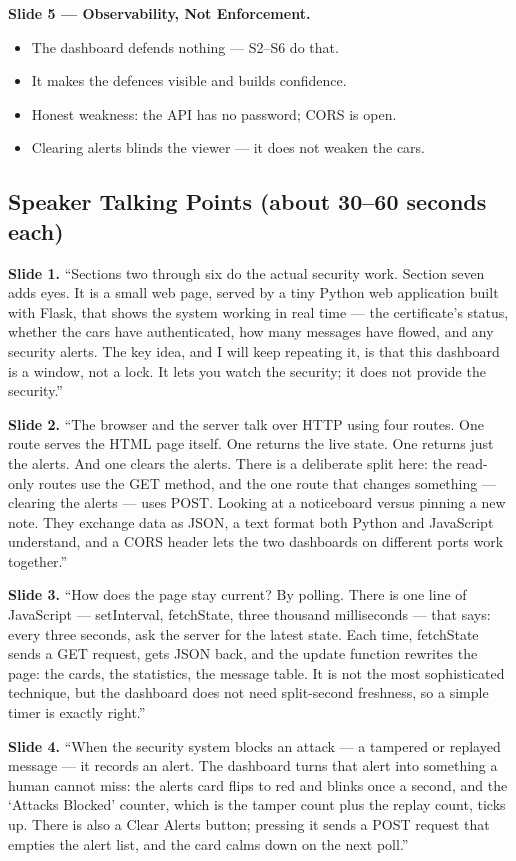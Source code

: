 \documentclass[11pt,a4paper]{report}
\begin{document}
\textbf{Slide 5 --- Observability, Not Enforcement.}
\begin{itemize}
  \item The dashboard defends nothing --- S2--S6 do that.
  \item It makes the defences visible and builds confidence.
  \item Honest weakness: the API has no password; CORS is open.
  \item Clearing alerts blinds the viewer --- it does not weaken the cars.
\end{itemize}

\subsection{Speaker Talking Points (about 30--60 seconds each)}

\textbf{Slide 1.} ``Sections two through six do the actual security work. Section
seven adds eyes. It is a small web page, served by a tiny Python web application
built with Flask, that shows the system working in real time --- the
certificate's status, whether the cars have authenticated, how many messages have
flowed, and any security alerts. The key idea, and I will keep repeating it, is
that this dashboard is a window, not a lock. It lets you watch the security; it
does not provide the security.''

\textbf{Slide 2.} ``The browser and the server talk over HTTP using four routes.
One route serves the HTML page itself. One returns the live state. One returns
just the alerts. And one clears the alerts. There is a deliberate split here: the
read-only routes use the GET method, and the one route that changes something ---
clearing the alerts --- uses POST. Looking at a noticeboard versus pinning a new
note. They exchange data as JSON, a text format both Python and JavaScript
understand, and a CORS header lets the two dashboards on different ports work
together.''

\textbf{Slide 3.} ``How does the page stay current? By polling. There is one line
of JavaScript --- setInterval, fetchState, three thousand milliseconds --- that
says: every three seconds, ask the server for the latest state. Each time,
fetchState sends a GET request, gets JSON back, and the update function rewrites
the page: the cards, the statistics, the message table. It is not the most
sophisticated technique, but the dashboard does not need split-second freshness,
so a simple timer is exactly right.''

\textbf{Slide 4.} ``When the security system blocks an attack --- a tampered or
replayed message --- it records an alert. The dashboard turns that alert into
something a human cannot miss: the alerts card flips to red and blinks once a
second, and the `Attacks Blocked' counter, which is the tamper count plus the
replay count, ticks up. There is also a Clear Alerts button; pressing it sends a
POST request that empties the alert list, and the card calms down on the next
poll.''
\end{document}
